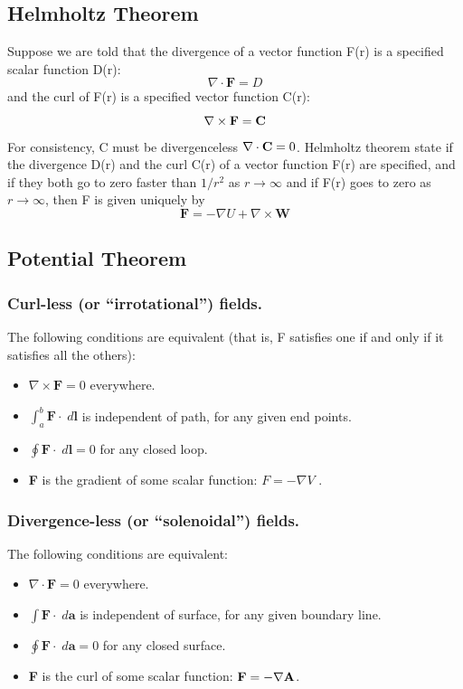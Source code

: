 \documentclass[../main.tex]{subfiles}
\begin{document}
\subsection*{Helmholtz Theorem}
Suppose we are told that the divergence of a vector function F(r) is a specified
scalar function D(r):
\begin{equation*}
    \nabla \cdot \mathbf{F}=D
\end{equation*}
and the curl of F(r) is a speciﬁed vector function C(r):
\begin{equation*}
    \nabla \times \mathbf{F}=\mathbf{C}
\end{equation*}
For consistency, C must be divergenceless $\nabla \cdot \mathbf{C}=0$. 
Helmholtz theorem state if the divergence D(r) and the curl C(r) 
of a vector function F(r) are speciﬁed, 
and if they both go to zero faster than $1/r^2$ as $ r \rightarrow \infty$
and if F(r)
goes to zero as $ r \rightarrow \infty$, 
then F is given uniquely by
\begin{equation*}
    \mathbf{F} =-\nabla U+\nabla \times \mathbf{W}
\end{equation*}

\subsection*{Potential Theorem}
\subsubsection*{Curl-less (or “irrotational”) fields.} 
The following conditions are equivalent
(that is, F satisﬁes one if and only if it satisﬁes all the others):
\begin{itemize}
    \item $\nabla \times \mathbf{F}=0$ everywhere.
    \item  $\int_{a}^{b}\mathbf{F}\cdot\;d\mathbf{l}$ is independent of path, for any given end points.
    \item $\oint\mathbf{F} \cdot\;d\mathbf{l}=0$ for any closed loop.
    \item \textbf{F} is the gradient of some scalar function: $F =- \nabla V$ .
\end{itemize}

\subsubsection*{Divergence-less (or “solenoidal”) fields.} 
The following conditions are equivalent:
\begin{itemize}
    \item $\nabla \cdot \mathbf{F}=0$ everywhere.
    \item  $\int\mathbf{F}\cdot\;d\mathbf{a}$ is independent of surface, for any given boundary line.
    \item $\oint\mathbf{F} \cdot\;d\mathbf{a}=0$ for any closed surface.
    \item \textbf{F} is the curl  of some scalar function: $\mathbf{F} =- \nabla \mathbf{A}$.
\end{itemize}
\end{document}

